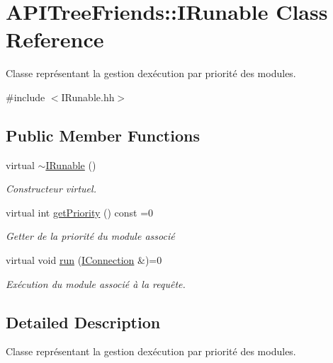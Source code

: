 \hypertarget{class_a_p_i_tree_friends_1_1_i_runable}{}\section{A\+P\+I\+Tree\+Friends\+:\+:I\+Runable Class Reference}
\label{class_a_p_i_tree_friends_1_1_i_runable}


Classe représentant la gestion d\textquotesingle{}exécution par priorité des modules.  




{\ttfamily \#include $<$I\+Runable.\+hh$>$}

\subsection*{Public Member Functions}
\begin{DoxyCompactItemize}
\item 
\hypertarget{class_a_p_i_tree_friends_1_1_i_runable_a27f59a13772ef3c82ff97358ef53d7a0}{}virtual \hyperlink{class_a_p_i_tree_friends_1_1_i_runable_a27f59a13772ef3c82ff97358ef53d7a0}{$\sim$\+I\+Runable} ()\label{class_a_p_i_tree_friends_1_1_i_runable_a27f59a13772ef3c82ff97358ef53d7a0}

\begin{DoxyCompactList}\small\item\em Constructeur virtuel. \end{DoxyCompactList}\item 
virtual int \hyperlink{class_a_p_i_tree_friends_1_1_i_runable_a9f283d64d34902f1c25910fd76c03190}{get\+Priority} () const =0
\begin{DoxyCompactList}\small\item\em Getter de la priorité du module associé \end{DoxyCompactList}\item 
virtual void \hyperlink{class_a_p_i_tree_friends_1_1_i_runable_ae8aac6b834090b5367080bcefa69d70f}{run} (\hyperlink{class_a_p_i_tree_friends_1_1_i_connection}{I\+Connection} \&)=0
\begin{DoxyCompactList}\small\item\em Exécution du module associé à la requête. \end{DoxyCompactList}\end{DoxyCompactItemize}


\subsection{Detailed Description}
Classe représentant la gestion d\textquotesingle{}exécution par priorité des modules. 

